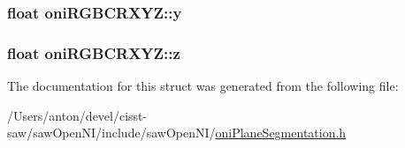 \subsubsection[{y}]{\setlength{\rightskip}{0pt plus 5cm}float oni\+R\+G\+B\+C\+R\+X\+Y\+Z\+::y}\label{structoni_r_g_b_c_r_x_y_z_a7359bd5770d4685c717c634451b33337}
\hypertarget{structoni_r_g_b_c_r_x_y_z_aa4745113704723d9220f40f77d67df5c}{}
\subsubsection[{z}]{\setlength{\rightskip}{0pt plus 5cm}float oni\+R\+G\+B\+C\+R\+X\+Y\+Z\+::z}\label{structoni_r_g_b_c_r_x_y_z_aa4745113704723d9220f40f77d67df5c}


The documentation for this struct was generated from the following file\+:\begin{DoxyCompactItemize}
\item 
/\+Users/anton/devel/cisst-\/saw/saw\+Open\+N\+I/include/saw\+Open\+N\+I/\hyperlink{oni_plane_segmentation_8h}{oni\+Plane\+Segmentation.\+h}\end{DoxyCompactItemize}
